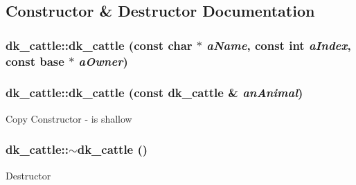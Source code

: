 \subsection{Constructor \& Destructor Documentation}
\hypertarget{classdk__cattle_a456fbc2e04f9a4aa1cf61824de078204}{
\subsubsection[{dk\_\-cattle}]{\setlength{\rightskip}{0pt plus 5cm}dk\_\-cattle::dk\_\-cattle (const char $\ast$ {\em aName}, \/  const int {\em aIndex}, \/  const {\bf base} $\ast$ {\em aOwner})}}
\label{classdk__cattle_a456fbc2e04f9a4aa1cf61824de078204}
\hypertarget{classdk__cattle_a4844c86db0f9abf8c884fcf503b2b984}{
\subsubsection[{dk\_\-cattle}]{\setlength{\rightskip}{0pt plus 5cm}dk\_\-cattle::dk\_\-cattle (const {\bf dk\_\-cattle} \& {\em anAnimal})}}
\label{classdk__cattle_a4844c86db0f9abf8c884fcf503b2b984}
Copy Constructor -\/ is shallow \hypertarget{classdk__cattle_a45c377e3aa07cb1c00e49797b0beefe4}{
\subsubsection[{$\sim$dk\_\-cattle}]{\setlength{\rightskip}{0pt plus 5cm}dk\_\-cattle::$\sim$dk\_\-cattle ()}}
\label{classdk__cattle_a45c377e3aa07cb1c00e49797b0beefe4}
Destructor 

